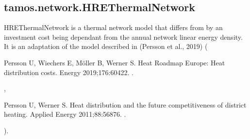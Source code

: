 \documentclass[letterpaper,10pt,english]{sphinxmanual}
\begin{document}
\sphinxstepscope


\subsection{tamos.network.HREThermalNetwork}
\label{\detokenize{generated/tamos.network.HREThermalNetwork:tamos-network-hrethermalnetwork}}\label{\detokenize{generated/tamos.network.HREThermalNetwork::doc}}

\begin{fulllineitems}
\label{\detokenize{generated/tamos.network.HREThermalNetwork:tamos.network.HREThermalNetwork}}
\pysigstartsignatures
{}
\pysigstopsignatures{}

\begin{fulllineitems}
\label{\detokenize{generated/tamos.network.HREThermalNetwork:tamos.network.HREThermalNetwork.__init__}}
\pysigstartsignatures
{}
\pysigstopsignatures
\sphinxAtStartPar
HREThermalNetwork is a thermal network model that differs from  by an investment cost
being dependant from the annual network linear energy density. It is an adaptation of the model described in
(Persson et al., 2019) (%
\begin{footnote}[1]\sphinxAtStartFootnote
Persson U, Wiechers E, Möller B, Werner S. Heat Roadmap Europe: Heat distribution costs.
Energy 2019;176:604\textendash{}22. .
%
\end{footnote}, %
\begin{footnote}[2]\sphinxAtStartFootnote
Persson U, Werner S. Heat distribution and the future competitiveness of district heating.
Applied Energy 2011;88:568\textendash{}76. .
%
\end{footnote}).


\end{fulllineitems}
\end{fulllineitems}
\end{document}
